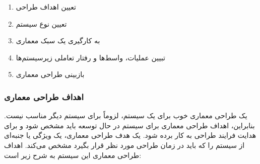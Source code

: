 \documentclass[12pt]{article}
\begin{document}
	\begin{enumerate}
		\renewcommand{\labelenumi}{گام \arabic{enumi}.}
		\item
		تعیین اهداف طراحی
		\item
		تعیین نوع سیستم
		\item
		به کارگیری یک سبک معماری
		\item
		تبیین عملیات، واسط‌ها و رفتار تعاملی زیرسیستم‌ها
		\item
		بازبینی طراحی معماری
	\end{enumerate}

	\subsubsection{اهداف طراحی معماری}
	یک طراحی معماری خوب برای یک سیستم، لزوماً برای سیستم دیگر مناسب نیست. بنابراین، اهداف طراحی معماری برای سیستم در حال توسعه باید مشخص شود و برای هدایت فرایند طراحی به کار برده شود. یک هدف طراحی معماری، یک ویژگی یا جنبه‌ای از سیستم را که باید در زمان طراحی مورد نظر قرار بگیرد مشخص می‌کند. اهداف طراحی معماری این سیستم به شرح زیر است:
\end{document}
